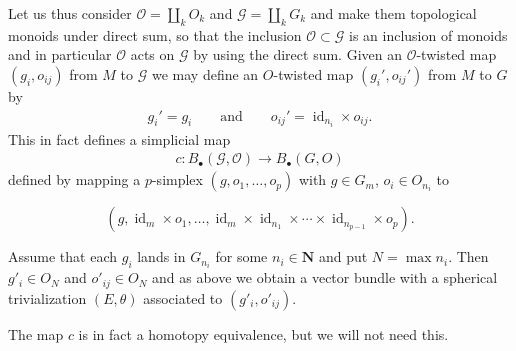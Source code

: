 \documentclass[reqno]{amsart}
\theoremstyle{theorem}
\theoremstyle{remark}
\theoremstyle{definition}
\newcommand{\N}{\mathbf{N}}
\newcommand{\GG}{\mathcal{G}}
\newcommand{\OO}{\mathcal{O}}
\DeclareMathOperator{\id}{id}
\begin{document}
Let us thus consider $\OO=\coprod_k O_k$ and $\GG=\coprod_k G_k$ and make them topological monoids under direct sum, so that the inclusion $\OO \subset \GG$ is an inclusion of monoids and in particular $\OO$ acts on $\GG$ by using the direct sum. Given an $\OO$-twisted map $(g_i,o_{ij})$ from $M$ to $\GG$ we may define an $O$-twisted map $(g_i',o_{ij}')$ from $M$ to $G$ by
\begin{align*}
  g_i' = g_i \qquad \textrm{and} \qquad o_{ij}' = \id_{n_i} \times o_{ij}.
\end{align*}
This in fact defines a simplicial map 
\begin{align}
  \label{eq:twisted-derivative:1}
  c:B_\bullet(\GG,\OO)\to B_\bullet(G,O)
\end{align}
defined by mapping a $p$-simplex $(g,o_1,\dots,o_p)$ with $g\in G_m$, $o_i\in O_{n_i}$ to 


\[(g, \id_m\times o_1,\dots,\id_m\times \id_{n_1}\times \cdots \times \id_{n_{p-1}}\times o_p).\]


Assume that each $g_i$ lands in $G_{n_i}$ for some $n_i \in \N$
and put $N=\max n_i$. Then $g'_i\in O_N$ and $o'_{ij}\in O_N$ and as above
we obtain a vector bundle with a spherical trivialization $(E,\theta)$
associated to $(g'_i,o'_{ij})$.


The map $c$ is in fact a homotopy equivalence, but we will not need this.
\end{document}
